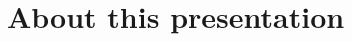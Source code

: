 \documentclass[10pt, compress, aspectratio=169]{beamer}
\begin{document}
\section{About this presentation}
\begin{frame}[standout]
   \begin{center}\ccbysa\end{center}
\end{frame}

\maketitle
\end{document}
